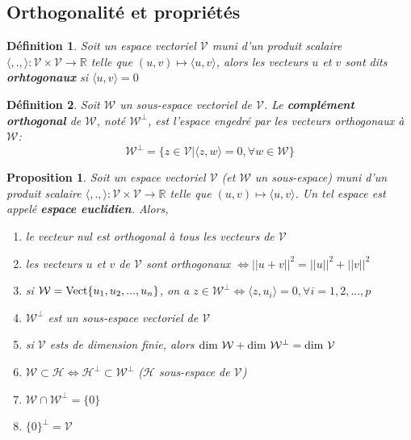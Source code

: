 \documentclass{article}[french, babel]
\newtheorem{mydef}{Définition}
\newtheorem{myprop}{Proposition}
\begin{document}
	\subsection{Orthogonalité et propriétés}
		\begin{mydef}
			Soit un espace vectoriel $\mathcal{V}$ muni d'un produit scalaire $\langle ,., \rangle : \mathcal{V}\times \mathcal{V} \longrightarrow\mathbb{R}$ telle que $(u,v)\longmapsto \langle u,v \rangle$, alors les vecteurs $u$ et $v$ sont dits \textbf{orhtogonaux} si $\langle u,v\rangle=0$
		\end{mydef}
		\begin{mydef}
			Soit $\mathcal{W}$ un sous-espace vectoriel de $\mathcal{V}$. Le \textbf{complément orthogonal} de $\mathcal{W}$, noté $\mathcal{W}^{\perp}$, est l'espace engedré par les vecteurs orthogonaux à $\mathcal{W}$: \[\mathcal{W}^{\perp}=\big\{z\in\mathcal{V} \lvert \langle z,w\rangle=0, \forall w\in\mathcal{W} \big\}\]
		\end{mydef}
		\begin{myprop}
			Soit un espace vectoriel $\mathcal{V}$ (et $\mathcal{W}$ un sous-espace) muni d'un produit scalaire $\langle ,., \rangle : \mathcal{V}\times \mathcal{V} \longrightarrow\mathbb{R}$ telle que $(u,v)\longmapsto \langle u,v \rangle$. Un tel espace est appelé \textbf{espace euclidien}. Alors,
			\begin{enumerate}
				\item le vecteur nul est orthogonal à tous les vecteurs de $\mathcal{V}$
				\item les vecteurs $u$ et $v$ de $\mathcal{V}$ sont orthogonaux $\Longleftrightarrow ||u+v||^2=||u||^2 +||v||^2$
				\item si $\mathcal{W}=\text{\normalfont{Vect}}\{u_1,u_2,...,u_n\}$, on a $z\in\mathcal{W}^{\perp}\Longleftrightarrow \langle z,u_i\rangle =0,\forall i = 1,2,...,p$
				\item $\mathcal{W}^{\perp}$ est un sous-espace vectoriel de $\mathcal{V}$
				\item si $\mathcal{V}$ ests de dimension finie, alors $\text{\normalfont{dim}} \ \mathcal{W}+\text{\normalfont{dim}} \ \mathcal{W}^{\perp}=\text{\normalfont{dim}} \ \mathcal{V}$
				\item $\mathcal{W}\subset\mathcal{H}\Longleftrightarrow \mathcal{H}^{\perp}\subset\mathcal{W}^{\perp}$ ($\mathcal{H}$ sous-espace de $\mathcal{V}$)
				\item $\mathcal{W}\cap\mathcal{W}^{\perp}=\{0\}$
				\item $\{0\}^{\perp}=\mathcal{V}$ 
			\end{enumerate}
		\end{myprop}
\end{document}
